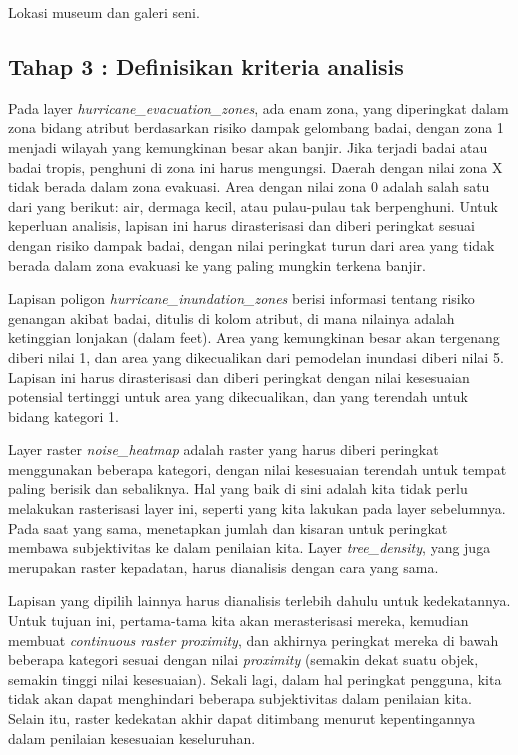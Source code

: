 \documentclass[]{book}
\begin{document}
Lokasi museum dan galeri seni.

\hypertarget{tahap-3-definisikan-kriteria-analisis}{%
\subsection{Tahap 3 : Definisikan kriteria analisis}\label{tahap-3-definisikan-kriteria-analisis}}

Pada layer \emph{hurricane\_evacuation\_zones}, ada enam zona, yang diperingkat dalam zona bidang atribut berdasarkan risiko dampak gelombang badai, dengan zona 1 menjadi wilayah yang kemungkinan besar akan banjir. Jika terjadi badai atau badai tropis, penghuni di zona ini harus mengungsi. Daerah dengan nilai zona X tidak berada dalam zona evakuasi. Area dengan nilai zona 0 adalah salah satu dari yang berikut: air, dermaga kecil, atau pulau-pulau tak berpenghuni. Untuk keperluan analisis, lapisan ini harus dirasterisasi dan diberi peringkat sesuai dengan risiko dampak badai, dengan nilai peringkat turun dari area yang tidak berada dalam zona evakuasi ke yang paling mungkin terkena banjir.

Lapisan poligon \emph{hurricane\_inundation\_zones} berisi informasi tentang risiko genangan akibat badai, ditulis di kolom atribut, di mana nilainya adalah ketinggian lonjakan (dalam feet). Area yang kemungkinan besar akan tergenang diberi nilai 1, dan area yang dikecualikan dari pemodelan inundasi diberi nilai 5. Lapisan ini harus dirasterisasi dan diberi peringkat dengan nilai kesesuaian potensial tertinggi untuk area yang dikecualikan, dan yang terendah untuk bidang kategori 1.

Layer raster \emph{noise\_heatmap} adalah raster yang harus diberi peringkat menggunakan beberapa kategori, dengan nilai kesesuaian terendah untuk tempat paling berisik dan sebaliknya. Hal yang baik di sini adalah kita tidak perlu melakukan rasterisasi layer ini, seperti yang kita lakukan pada layer sebelumnya. Pada saat yang sama, menetapkan jumlah dan kisaran untuk peringkat membawa subjektivitas ke dalam penilaian kita. Layer \emph{tree\_density}, yang juga merupakan raster kepadatan, harus dianalisis dengan cara yang sama.

Lapisan yang dipilih lainnya harus dianalisis terlebih dahulu untuk kedekatannya. Untuk tujuan ini, pertama-tama kita akan merasterisasi mereka, kemudian membuat \emph{continuous raster proximity}, dan akhirnya peringkat mereka di bawah beberapa kategori sesuai dengan nilai \emph{proximity} (semakin dekat suatu objek, semakin tinggi nilai kesesuaian). Sekali lagi, dalam hal peringkat pengguna, kita tidak akan dapat menghindari beberapa subjektivitas dalam penilaian kita. Selain itu, raster kedekatan akhir dapat ditimbang menurut kepentingannya dalam penilaian kesesuaian keseluruhan.
\end{document}
